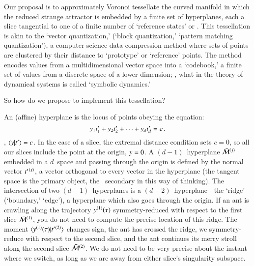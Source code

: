Our proposal is to approximately
{Voronoi
tessellate}  the curved manifold in which the reduced strange attractor
is embedded by a finite set of hyperplanes, each a slice
tangential to one of a finite number of `reference states' or
{\template}. This tessellation is akin to the
{`vector quantization,'} (`block quantization,'  `pattern matching quantization'),
a computer science data compression method where sets of points are
clustered by their distance to `prototype' or `reference' points. The
method encodes values from a multidimensional vector space into a
`codebook,' a finite set of values from a discrete space of a lower
dimension; \ie, what in the theory of dynamical systems is called
`symbolic dynamics.'

So how do we propose to implement this tessellation?

An (affine) hyperplane is the locus of points obeying the equation:
\[
y_1t'_{1} + y_2t'_{2} + \cdots + y_dt'_{d} = c
\,.
\]
\ie, $\braket{\sspRed}{\sliceTan{}}=c$. In the case of a slice, the
extremal distance condition  sets $c=0$, so all our
slices include the point at the origin, $y=0$. A $(d\!-\!1)$\dmn\
hyperplane $\bar{\cal M}{}^{(j)}$ embedded in a $d$\dmn\ space and passing
through the origin is defined by the normal vector $t'_{}{}^{(j)}$,
a vector orthogonal to every vector in the hyperplane (the tangent space
\sliceTan{} is the primary object, the {\template} \slicep\ secondary in
this way of thinking). The intersection of two $(d\!-\!1)$\dmn\
hyperplanes is a $(d\!-\!2)$\dmn\ hyperplane - the `ridge' (`boundary,'
`edge'), a hyperplane which also goes through the origin. If an ant is
crawling along the trajectory $y{}^{(1)}(\tau)$ symmetry-reduced
with respect to the first slice $\bar{\cal M}{}^{(1)}$, you do not need to
compute the precise location of this ridge. The moment
$\braket{\sspRed{}^{(1)}(\tau)}{\sliceTan{}{}^{(2)}}$ changes sign, the
ant has crossed the ridge, we symmetry-reduce with respect to the second
slice, and the ant continues its merry stroll along the second slice
$\bar{\cal M}{}^{(2)}$. We do not need to be very precise about the instant
where we switch, as long as we are away from either slice's singularity
subspace.

